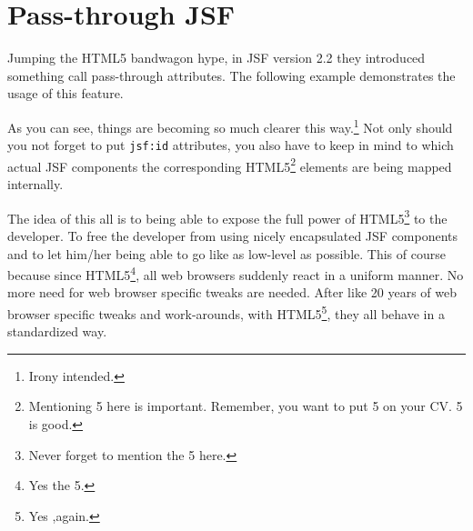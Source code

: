 \section{Pass-through JSF}
Jumping the HTML5 bandwagon hype, in JSF version 2.2 they introduced something call pass-through attributes.
The following example demonstrates the usage of this feature.

As you can see, things are becoming so much clearer this way.\footnote{Irony intended.}
Not only should you not forget to put \texttt{jsf:id} attributes,
you also have to keep in mind to which actual JSF components the corresponding HTML5\footnote{Mentioning 5 here is important. Remember, you want to put 5 on your CV. 5 is good.} elements are being mapped internally.

The idea of this all is to being able to expose the full power of HTML5\footnote{Never forget to mention the 5 here.} to the developer.
To free the developer from using nicely encapsulated JSF components and to let him/her being able to go like as low-level as possible.
This of course because since HTML5\footnote{Yes the 5.}, all web browsers suddenly react in a uniform manner.
No more need for web browser specific tweaks are needed.
After like 20 years of web browser specific tweaks and work-arounds, with HTML5\footnote{Yes ,again.}, they all behave in a standardized way.

